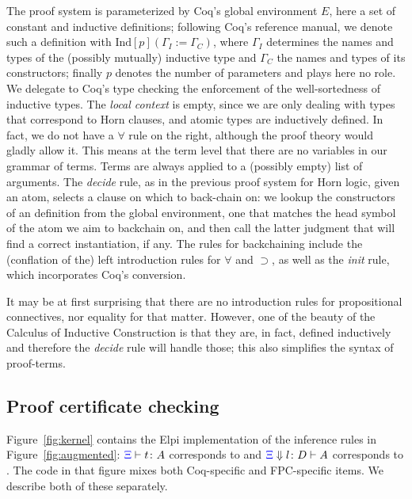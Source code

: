 The proof system is parameterized by Coq's global environment $E$,
here a set of constant and inductive definitions; following Coq's
reference manual, we denote such a definition with
$\mathrm{Ind}[p] (\Gamma_I := \Gamma_C)$, where $\Gamma_I$ determines
the names and types of the (possibly mutually) inductive type and
$\Gamma_C$ the names and types of its constructors; finally $p$
denotes the number of parameters and plays here no role. We delegate to
Coq's type checking the enforcement of the well-sortedness of
inductive types. The \emph{local context} is empty, since we are only
dealing with types that correspond to Horn clauses, and atomic types
are inductively defined. In fact, we do not have a $\forall$ rule on
the right, although the proof theory would gladly allow it. This means
at the term level that there are no variables in our grammar of
terms. Terms are always applied to a (possibly empty) list of
arguments.  The \emph{decide} rule, %
as in the previous proof system for Horn logic,  given an atom,
 selects a clause on which to back-chain on: we lookup the
constructors of an  definition from the global
environment, one that matches the head symbol of the atom we aim to backchain on, and then
call the latter judgment that will find a correct instantiation, if any. The rules for backchaining include
 the (conflation of the) left introduction rules for
$\forall$ and $\supset$, as well as the \emph{init} rule, which incorporates Coq's conversion.

It may be at first surprising that there are no
introduction rules for propositional connectives, nor equality for
that matter. However, one of the beauty of the Calculus of Inductive
Construction is that they are, in fact,  defined inductively and
therefore the \emph{decide} rule will handle those; this also
simplifies the syntax of proof-terms.

\subsection{Proof certificate checking}
\label{ssec:cert}
Figure~\ref{fig:kernel} contains the Elpi implementation of the
inference rules in Figure~\ref{fig:augmented}: ${\color{blue}{\Xi}}\vdash t \colon A$ corresponds to
 and ${\color{blue}{\Xi}} \Downarrow  l \colon D\vdash A$ corresponds to
.
%
The code in that figure mixes both Coq-specific and
FPC-specific items.  We describe both of these separately.

